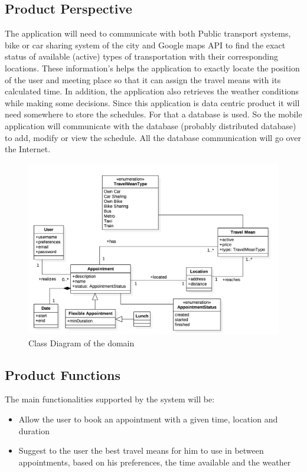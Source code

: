 \documentclass[12pt]{article}
\begin{document}
\subsection{Product Perspective}
The application will need to communicate with both Public transport systems, bike or car sharing system of the city and Google maps API to find the exact status of available (active) types of transportation with their corresponding locations. These information’s helps the application to exactly locate the position of the user and meeting place so that it can assign the travel means with its calculated time. In addition, the application also retrieves the weather conditions while making some decisions. 
Since this application is data centric product it will need somewhere to store the schedules. For that a database is used. So the mobile application will communicate with the database (probably distributed database) to add, modify or view the schedule. All the database communication will go over the Internet.
    \begin{figure}[ht]
        \includegraphics[scale=0.52]{domainModel.png}
        \caption{Class Diagram of the domain}
    \label{fig:domainModel}
    \end{figure}
    
\subsection{Product Functions}
The main functionalities supported by the system will be:
\begin{itemize}
    \item Allow the user to book an appointment with a given time, location and duration
    \item Suggest to the user the best travel means for him to use in between appointments, based on his preferences, the time available and the weather
\end{itemize}
\end{document}
